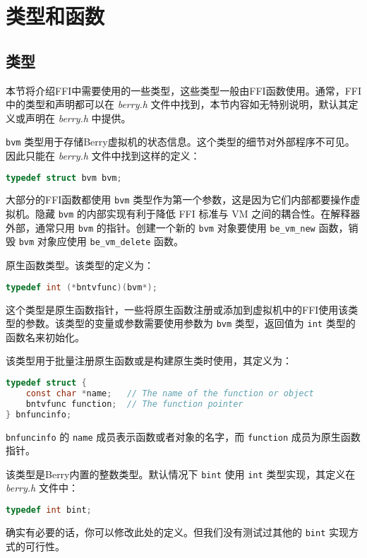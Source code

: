 \section{类型和函数}

\subsection{类型}

本节将介绍FFI中需要使用的一些类型，这些类型一般由FFI函数使用。通常，FFI中的类型和声明都可以在 \textit{berry.h} 文件中找到，本节内容如无特别说明，默认其定义或声明在 \textit{berry.h} 中提供。


\texttt{bvm} 类型用于存储Berry虚拟机的状态信息。这个类型的细节对外部程序不可见。因此只能在 \textit{berry.h} 文件中找到这样的定义：
\begin{lstlisting}[language=c, numbers=none]
typedef struct bvm bvm;
\end{lstlisting}

大部分的FFI函数都使用 \texttt{bvm} 类型作为第一个参数，这是因为它们内部都要操作虚拟机。隐藏 \texttt{bvm} 的内部实现有利于降低 FFI 标准与 VM 之间的耦合性。在解释器外部，通常只用 \texttt{bvm} 的指针。创建一个新的 \texttt{bvm} 对象要使用 \texttt{be\_vm\_new} 函数，销毁 \texttt{bvm} 对象应使用 \texttt{be\_vm\_delete} 函数。


原生函数类型。该类型的定义为：
\begin{lstlisting}[language=c, style=berry, numbers=none]
typedef int (*bntvfunc)(bvm*);
\end{lstlisting}
这个类型是原生函数指针，一些将原生函数注册或添加到虚拟机中的FFI使用该类型的参数。该类型的变量或参数需要使用参数为 \texttt{bvm} 类型，返回值为 \texttt{int} 类型的函数名来初始化。


该类型用于批量注册原生函数或是构建原生类时使用，其定义为：
\begin{lstlisting}[language=c, style=berry, numbers=none]
typedef struct {
    const char *name;   // The name of the function or object
    bntvfunc function;  // The function pointer
} bnfuncinfo;
\end{lstlisting}
\texttt{bnfuncinfo} 的 \texttt{name} 成员表示函数或者对象的名字，而 \texttt{function} 成员为原生函数指针。


该类型是Berry内置的整数类型。默认情况下 \texttt{bint} 使用 \texttt{int} 类型实现，其定义在 \textit{berry.h} 文件中：
\begin{lstlisting}[language=c, style=berry, numbers=none]
typedef int bint;
\end{lstlisting}
确实有必要的话，你可以修改此处的定义。但我们没有测试过其他的 \texttt{bint} 实现方式的可行性。


